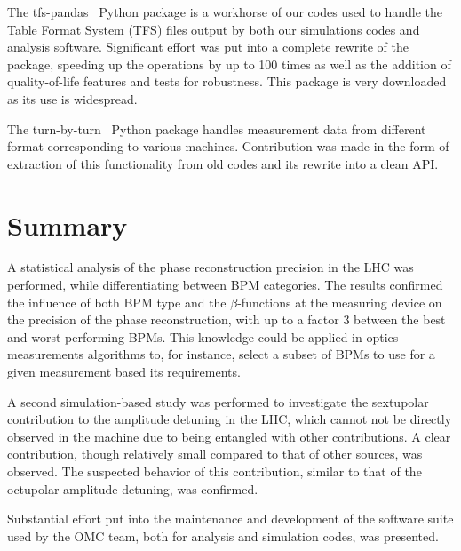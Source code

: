 The tfs-pandas~\cite{CODE:OMC:tfs_pandas} Python package is a workhorse of our codes used to handle the Table Format System (TFS) files output by both our simulations codes and analysis software.
Significant effort was put into a complete rewrite of the package, speeding up the operations by up to \num{100} times as well as the addition of quality-of-life features and tests for robustness.
This package is very downloaded as its use is widespread.

The turn-by-turn~\cite{CODE:OMC:turn_by_turn} Python package handles measurement data from different format corresponding to various machines.
Contribution was made in the form of extraction of this functionality from old codes and its rewrite into a clean API.

\section{Summary}

A statistical analysis of the phase reconstruction precision in the LHC was performed, while differentiating between BPM categories.
The results confirmed the influence of both BPM type and the \(\beta\)-functions at the measuring device on the precision of the phase reconstruction, with up to a factor \num{3} between the best and worst performing BPMs.
This knowledge could be applied in optics measurements algorithms to, for instance, select a subset of BPMs to use for a given measurement based its requirements.

A second simulation-based study was performed to investigate the sextupolar contribution to the amplitude detuning in the LHC, which cannot not be directly observed in the machine due to being entangled with other contributions.
A clear contribution, though relatively small compared to that of other sources, was observed.
The suspected behavior of this contribution, similar to that of the octupolar amplitude detuning, was confirmed.

Substantial effort put into the maintenance and development of the software suite used by the OMC team, both for analysis and simulation codes, was presented.
